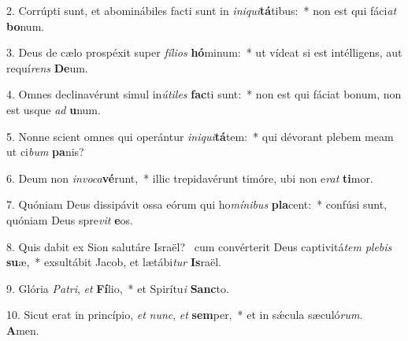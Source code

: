 2. Corrúpti sunt, et abominábiles facti sunt in \textit{in}\textit{i}\textit{qui}\textbf{tá}tibus:~*  non est qui fáci\textit{at} \textbf{bo}num.\

3. Deus de cælo prospéxit super \textit{fí}\textit{li}\textit{os} \textbf{hó}minum:~*  ut vídeat si est intélligens, aut requí\textit{rens} \textbf{De}um.\

4. Omnes declinavérunt simul in\textit{ú}\textit{ti}\textit{les} \textbf{fac}ti sunt:~*  non est qui fáciat bonum, non est usque \textit{ad} \textbf{u}num.\

5. Nonne scient omnes qui operántur \textit{in}\textit{i}\textit{qui}\textbf{tá}tem:~*  qui dévorant plebem meam ut ci\textit{bum} \textbf{pa}nis?\

6. Deum non \textit{in}\textit{vo}\textit{ca}\textbf{vé}runt,~*  illic trepidavérunt timóre, ubi non e\textit{rat} \textbf{ti}mor.\

7. Quóniam Deus dissipávit ossa eórum qui ho\textit{mí}\textit{ni}\textit{bus} \textbf{pla}cent:~*  confúsi sunt, quóniam Deus spre\textit{vit} \textbf{e}os.\

8. Quis dabit ex Sion salutáre Israël? \dag\  cum convérterit Deus captivitá\textit{tem} \textit{ple}\textit{bis} \textbf{su}æ,~*  exsultábit Jacob, et lætábi\textit{tur} \textbf{Is}raël.\

9. Glória \textit{Pa}\textit{tri}, \textit{et} \textbf{Fí}lio,~*  et Spirítu\textit{i} \textbf{Sanc}to.\

10. Sicut erat in princípio, \textit{et} \textit{nunc}, \textit{et} \textbf{sem}per,~*  et in sǽcula sæculó\textit{rum}. \textbf{A}men.\

